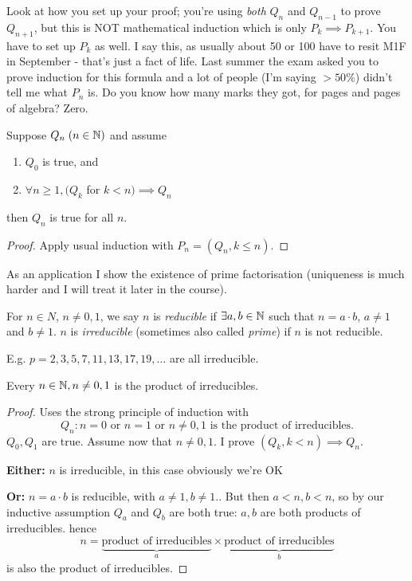 \documentclass[twoside]{scrartcl}
\begin{document}
\begin{warning}
Look at how you set up your proof; you're using \emph{both} $Q_n$ and $Q_{n-1}$ to prove $Q_{n+1}$, but this is NOT mathematical induction which is only $P_k \implies P_{k+1}$. You have to set up $P_k$ as well. I say this, as usually about 50 or 100 have to resit M1F in September - that's just a fact of life. Last summer the exam asked you to prove induction for this formula and a lot of people (I'm saying $> 50\%$) didn't tell me what $P_n$ is. Do you know how many marks they got, for pages and pages of algebra? Zero. 
\end{warning}


\begin{definition}
Suppose $Q_n\; (n \in\mathbb{N})$ and assume 
\begin{enumerate}
\item $Q_0$ is true, and
\item $\forall n \geq 1, (Q_k$ for $k < n)\implies Q_n$	
\end{enumerate}
then $Q_n$ is true for all $n$.
\end{definition}

\begin{proof} Apply usual induction with $P_n = (Q_n, k \leq n)$.
\end{proof}

As an application I show the existence of prime factorisation (uniqueness is much harder and I will treat it later in the course).\\


\begin{definition}
For $n \in N$, $n \neq 0,1$, we say $n$ is \emph{reducible} if $\exists a,b \in\mathbb{N}$ such that $n = a\cdot b$, $a \neq 1$ and $b \neq 1$. $n$ is \emph{irreducible} (sometimes also called \emph{prime}) if $n$ is not reducible. 		
\end{definition}

E.g. $p = 2,3,5,7,11,13,17,19,\dots$ are all irreducible. \\

\begin{theorem} 
Every $n \in\mathbb{N}, n \neq 0,1$ is the product of irreducibles. 	
\end{theorem}

\begin{proof}
Uses the strong principle of induction with 
\[Q_n: n = 0\text{ or }n = 1\text{ or }n \neq 0,1 \text{ is the product of irreducibles.}\]$Q_0, Q_1$ are true. Assume now that $n \neq 0,1$. I prove $(Q_k, k< n) \implies Q_n$. 

\textbf{Either:} $n$ is irreducible, in this case obviously we're OK

\textbf{Or:} $n = a\cdot b$ is reducible, with $a \neq 1, b \neq 1.$. But then $a < n, b < n$, so by our inductive assumption $Q_a$ and $Q_b$ are both true: $a,b$ are both products of irreducibles. hence 
\[n = \underbrace{\text{product of irreducibles}}_{a} \times \underbrace{\text{product of irreducibles}}_{b}\]
is also the product of irreducibles.
\end{proof}
\end{document}
